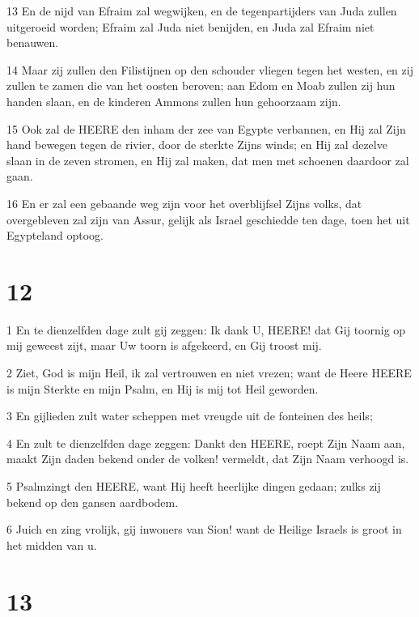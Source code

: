 \par 13 En de nijd van Efraim zal wegwijken, en de tegenpartijders van Juda zullen uitgeroeid worden; Efraim zal Juda niet benijden, en Juda zal Efraim niet benauwen.
\par 14 Maar zij zullen den Filistijnen op den schouder vliegen tegen het westen, en zij zullen te zamen die van het oosten beroven; aan Edom en Moab zullen zij hun handen slaan, en de kinderen Ammons zullen hun gehoorzaam zijn.
\par 15 Ook zal de HEERE den inham der zee van Egypte verbannen, en Hij zal Zijn hand bewegen tegen de rivier, door de sterkte Zijns winds; en Hij zal dezelve slaan in de zeven stromen, en Hij zal maken, dat men met schoenen daardoor zal gaan.
\par 16 En er zal een gebaande weg zijn voor het overblijfsel Zijns volks, dat overgebleven zal zijn van Assur, gelijk als Israel geschiedde ten dage, toen het uit Egypteland optoog.

\chapter{12}

\par 1 En te dienzelfden dage zult gij zeggen: Ik dank U, HEERE! dat Gij toornig op mij geweest zijt, maar Uw toorn is afgekeerd, en Gij troost mij.
\par 2 Ziet, God is mijn Heil, ik zal vertrouwen en niet vrezen; want de Heere HEERE is mijn Sterkte en mijn Psalm, en Hij is mij tot Heil geworden.
\par 3 En gijlieden zult water scheppen met vreugde uit de fonteinen des heils;
\par 4 En zult te dienzelfden dage zeggen: Dankt den HEERE, roept Zijn Naam aan, maakt Zijn daden bekend onder de volken! vermeldt, dat Zijn Naam verhoogd is.
\par 5 Psalmzingt den HEERE, want Hij heeft heerlijke dingen gedaan; zulks zij bekend op den gansen aardbodem.
\par 6 Juich en zing vrolijk, gij inwoners van Sion! want de Heilige Israels is groot in het midden van u.

\chapter{13}

